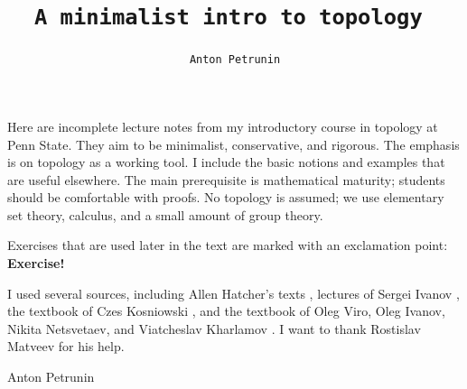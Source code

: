 \documentclass[twoside]{book}
\def\thetitle{A minimalist intro to topology}
\def\theauthors{Anton Petrunin}
\begin{document}

\title{
\tt \thetitle
}
\author{\tt \theauthors}
\date{}
\maketitle
\thispagestyle{empty}

Here are incomplete lecture notes from my introductory course in topology at Penn State.
They aim to be minimalist, conservative, and rigorous.
The emphasis is on topology as a working tool.
I include the basic notions and examples that are useful elsewhere.
The main prerequisite is mathematical maturity; students should be comfortable with proofs.
No topology is assumed; we use elementary set theory, calculus, and a small amount of group theory.

Exercises that are used later in the text are marked with an exclamation point: \textbf{Exercise!}

I used several sources, including Allen Hatcher's texts \cite{hatcher,hatcher-2002},
lectures of Sergei Ivanov \cite{ivanov},
the textbook of Czes Kosniowski \cite{kosniowski},
and the textbook of Oleg Viro, Oleg Ivanov, Nikita Netsvetaev, and Viatcheslav Kharlamov \cite{viro-ivanov-netsvetaev-kharlamov}.
I want to thank Rostislav Matveev for his help.

\medskip

\begin{flushright}
Anton Petrunin
\end{flushright}
\null\vfill{}
\newpage
\cleardoublepage
{}
{}
\tableofcontents












\appendix


{\footnotesize

}



{
\newpage
{}
\footnotesize\sloppy


\def\emph{\textit}

\printbibliography[heading=bibintoc]
\fussy
}
\end{document}
